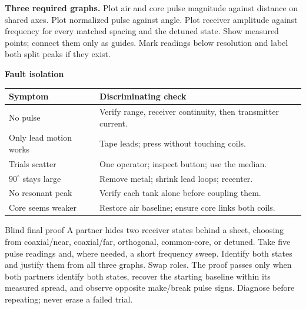 \begin{minipage}[t]{\linewidth}
\textbf{Three required graphs.} Plot air and core pulse magnitude against
distance on shared axes. Plot normalized pulse against angle. Plot receiver
amplitude against frequency for every matched spacing and the detuned state.
Show measured points; connect them only as guides. Mark readings below
resolution and label both split peaks if they exist.

\medskip
{}
\end{minipage}\par\medskip
\begin{minipage}[t]{\linewidth}
\textbf{Fault isolation}
\footnotesize
\begin{tabular}{@{}p{}p{}@{}}
\toprule Symptom & Discriminating check\\\midrule
No pulse & Verify range, receiver continuity, then transmitter current.\\
Only lead motion works & Tape leads; press without touching coils.\\
Trials scatter & One operator; inspect button; use the median.\\
\(90^\circ\) stays large & Remove metal; shrink lead loops; recenter.\\
No resonant peak & Verify each tank alone before coupling them.\\
Core seems weaker & Restore air baseline; ensure core links both coils.\\
\bottomrule
\end{tabular}
\end{minipage}

\begin{gate}{Blind final proof}
A partner hides two receiver states behind a sheet, choosing from coaxial/near,
coaxial/far, orthogonal, common-core, or detuned. Take five pulse readings and,
where needed, a short frequency sweep. Identify both states and justify them
from all three graphs. Swap roles. The proof passes only when both partners
identify both states, recover the starting baseline within its measured spread,
and observe opposite make/break pulse signs. Diagnose before repeating; never
erase a failed trial.
\end{gate}

